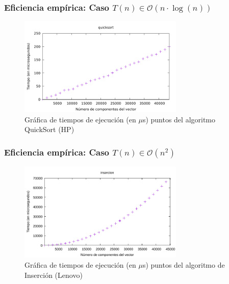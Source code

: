 \documentclass[8pt, aspectratio=169]{beamer}
\begin{document}
    \begin{frame}
        \frametitle{Eficiencia empírica: Caso $T(n) \in \mathcal{O}(n\cdot\log(n))$}

        \begin{figure}
            \includegraphics[width=0.7\textwidth]{../data/hp/quicksort-points.pdf}
            \caption{Gráfica de tiempos de ejecución (en $\mu$s) puntos del algoritmo QuickSort (HP)}
        \end{figure}
    \end{frame}

    \begin{frame}
        \frametitle{Eficiencia empírica: Caso $T(n) \in \mathcal{O}(n^2)$}

        \begin{figure}
            \includegraphics[width=0.7\textwidth]{../data/lenovo/insercion-points.pdf}
            \caption{Gráfica de tiempos de ejecución (en $\mu$s) puntos del algoritmo de Inserción (Lenovo)}
        \end{figure}
    \end{frame}
\end{document}
